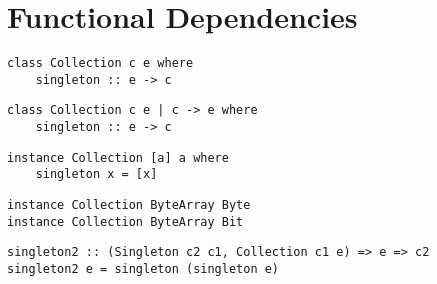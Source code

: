 \section{Functional Dependencies}
\begin{verbatim}
class Collection c e where
    singleton :: e -> c
\end{verbatim}

\begin{verbatim}
class Collection c e | c -> e where
    singleton :: e -> c
\end{verbatim}

\begin{verbatim}
instance Collection [a] a where
    singleton x = [x]
\end{verbatim}

\begin{verbatim}
instance Collection ByteArray Byte
instance Collection ByteArray Bit
\end{verbatim}

\begin{verbatim}
singleton2 :: (Singleton c2 c1, Collection c1 e) => e => c2
singleton2 e = singleton (singleton e)
\end{verbatim}
